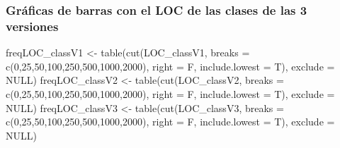 \documentclass[
]{article}
\newenvironment{Shaded}{\begin{snugshade}}{\end{snugshade}}
\newcommand{\AttributeTok}[1]{\textcolor[rgb]{0.77,0.63,0.00}{#1}}
\newcommand{\ConstantTok}[1]{\textcolor[rgb]{0.00,0.00,0.00}{#1}}
\newcommand{\DecValTok}[1]{\textcolor[rgb]{0.00,0.00,0.81}{#1}}
\newcommand{\FunctionTok}[1]{\textcolor[rgb]{0.00,0.00,0.00}{#1}}
\newcommand{\NormalTok}[1]{#1}
\newcommand{\OtherTok}[1]{\textcolor[rgb]{0.56,0.35,0.01}{#1}}
\begin{document}
\hypertarget{gruxe1ficas-de-barras-con-el-loc-de-las-clases-de-las-3-versiones}{%
\subsubsection{Gráficas de barras con el LOC de las clases de las 3
versiones}\label{gruxe1ficas-de-barras-con-el-loc-de-las-clases-de-las-3-versiones}}

\begin{Shaded}
\begin{Highlighting}[]
\NormalTok{freqLOC\_classV1 }\OtherTok{\textless{}{-}} \FunctionTok{table}\NormalTok{(}\FunctionTok{cut}\NormalTok{(LOC\_classV1, }\AttributeTok{breaks =} \FunctionTok{c}\NormalTok{(}\DecValTok{0}\NormalTok{,}\DecValTok{25}\NormalTok{,}\DecValTok{50}\NormalTok{,}\DecValTok{100}\NormalTok{,}\DecValTok{250}\NormalTok{,}\DecValTok{500}\NormalTok{,}\DecValTok{1000}\NormalTok{,}\DecValTok{2000}\NormalTok{), }\AttributeTok{right =}\NormalTok{ F, }\AttributeTok{include.lowest =}\NormalTok{ T), }\AttributeTok{exclude =} \ConstantTok{NULL}\NormalTok{)}
\NormalTok{freqLOC\_classV2 }\OtherTok{\textless{}{-}} \FunctionTok{table}\NormalTok{(}\FunctionTok{cut}\NormalTok{(LOC\_classV2, }\AttributeTok{breaks =} \FunctionTok{c}\NormalTok{(}\DecValTok{0}\NormalTok{,}\DecValTok{25}\NormalTok{,}\DecValTok{50}\NormalTok{,}\DecValTok{100}\NormalTok{,}\DecValTok{250}\NormalTok{,}\DecValTok{500}\NormalTok{,}\DecValTok{1000}\NormalTok{,}\DecValTok{2000}\NormalTok{), }\AttributeTok{right =}\NormalTok{ F, }\AttributeTok{include.lowest =}\NormalTok{ T), }\AttributeTok{exclude =} \ConstantTok{NULL}\NormalTok{)}
\NormalTok{freqLOC\_classV3 }\OtherTok{\textless{}{-}} \FunctionTok{table}\NormalTok{(}\FunctionTok{cut}\NormalTok{(LOC\_classV3, }\AttributeTok{breaks =} \FunctionTok{c}\NormalTok{(}\DecValTok{0}\NormalTok{,}\DecValTok{25}\NormalTok{,}\DecValTok{50}\NormalTok{,}\DecValTok{100}\NormalTok{,}\DecValTok{250}\NormalTok{,}\DecValTok{500}\NormalTok{,}\DecValTok{1000}\NormalTok{,}\DecValTok{2000}\NormalTok{), }\AttributeTok{right =}\NormalTok{ F, }\AttributeTok{include.lowest =}\NormalTok{ T), }\AttributeTok{exclude =} \ConstantTok{NULL}\NormalTok{)}


\end{Highlighting}
\end{Shaded}
\end{document}
